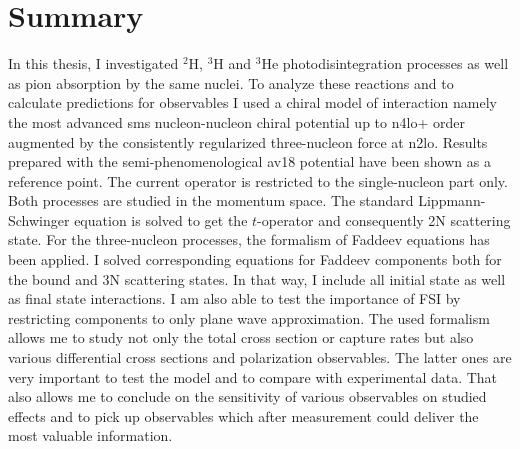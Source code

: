 \chapter{Summary}

In this thesis, I investigated $^2$H, $^3$H and $^3$He photodisintegration processes
as well as pion absorption by the same nuclei. To analyze these reactions
and to calculate predictions for observables I used a chiral model of interaction
namely the most advanced \gls{sms} nucleon-nucleon chiral potential up to \gls{n4lo+} order
augmented by the consistently regularized three-nucleon force at \gls{n2lo}.
Results prepared with the semi-phenomenological \gls{av18} potential have been shown as 
a reference point. The current operator is restricted to the single-nucleon part only.
Both processes are studied in the momentum space.
The standard Lippmann-Schwinger equation is solved to get the $t$-operator and consequently
2N scattering state. For the three-nucleon processes, the formalism of Faddeev equations
has been applied.
I solved corresponding equations for Faddeev components both for the bound and 3N scattering states.
In that way, I include all initial state as well as final state interactions.
I am also able to test the importance of FSI by restricting components to only plane wave approximation.
The used formalism allows me to study not only the total cross section or capture rates
but also various differential cross sections and polarization
observables. The latter ones are very important to test the model and to compare with experimental data.
That also allows me to conclude on the sensitivity of various observables on studied effects and to 
pick up observables which after measurement could deliver the most valuable information.

